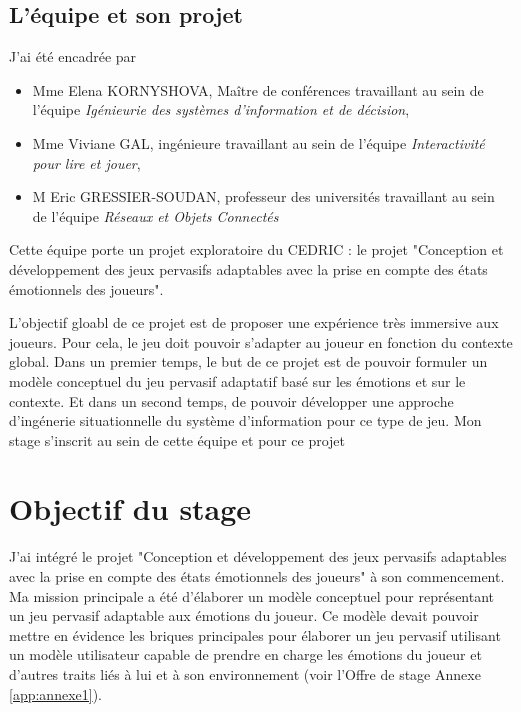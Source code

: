 \documentclass{article}
\begin{document}
	\subsection{L'équipe et son projet}
		J'ai été encadrée par 
		\begin{itemize}
			\item Mme Elena KORNYSHOVA, Maître de conférences travaillant au sein de l'équipe \textit{Igénieurie des systèmes d'information et de décision}, 
			\item Mme Viviane GAL, ingénieure travaillant au sein de l'équipe \textit{Interactivité pour lire et jouer},
			\item M Eric GRESSIER-SOUDAN, professeur des universités travaillant au sein de l'équipe \textit{Réseaux et Objets Connectés}
		\end{itemize}
		Cette équipe porte un projet exploratoire du CEDRIC : le projet "Conception et développement des jeux pervasifs adaptables avec la prise en compte des états émotionnels des joueurs".\par
		L'objectif gloabl de ce projet est de proposer une expérience très immersive aux joueurs. 
		Pour cela, le jeu doit pouvoir s'adapter au joueur en fonction du contexte global.
		Dans un premier temps, le but de ce projet est de pouvoir formuler un modèle conceptuel du jeu pervasif adaptatif basé sur les émotions et sur le contexte. 
		Et dans un second temps, de pouvoir développer une approche d'ingénerie situationnelle du système d'information pour ce type de jeu.\newline
		Mon stage s'inscrit au sein de cette équipe et pour ce projet 

\section{Objectif du stage}
	J'ai intégré le projet "Conception et développement des jeux pervasifs adaptables avec la prise en compte des états émotionnels des joueurs" à son commencement. 
	Ma mission principale a été d'élaborer un modèle conceptuel pour représentant un jeu pervasif adaptable aux émotions du joueur.
	Ce modèle devait pouvoir mettre en évidence les briques principales pour élaborer un jeu pervasif utilisant un modèle utilisateur capable de prendre en charge les émotions du joueur et d'autres traits liés à lui et à son environnement (voir l'Offre de stage Annexe \ref{app:annexe1}).
\end{document}
